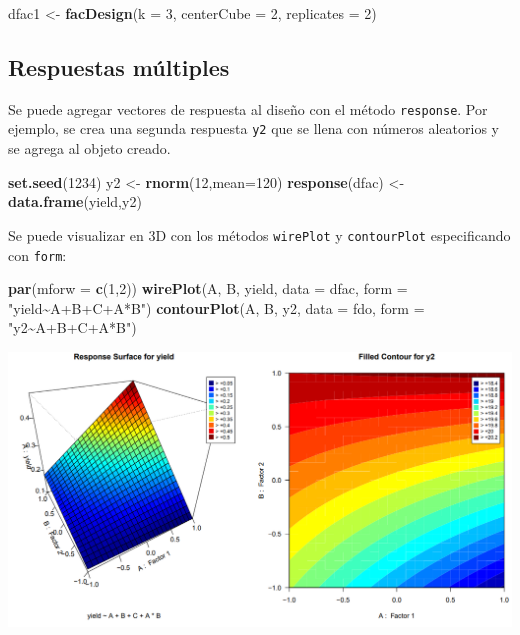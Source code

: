 \documentclass[
]{book}
\newenvironment{Shaded}{\begin{snugshade}}{\end{snugshade}}
\newcommand{\AttributeTok}[1]{\textcolor[rgb]{0.13,0.29,0.53}{#1}}
\newcommand{\DecValTok}[1]{\textcolor[rgb]{0.00,0.00,0.81}{#1}}
\newcommand{\FunctionTok}[1]{\textcolor[rgb]{0.13,0.29,0.53}{\textbf{#1}}}
\newcommand{\NormalTok}[1]{#1}
\newcommand{\OtherTok}[1]{\textcolor[rgb]{0.56,0.35,0.01}{#1}}
\newcommand{\StringTok}[1]{\textcolor[rgb]{0.31,0.60,0.02}{#1}}
\begin{document}
\begin{Shaded}
\begin{Highlighting}[]
\NormalTok{dfac1 }\OtherTok{\textless{}{-}} \FunctionTok{facDesign}\NormalTok{(}\AttributeTok{k =} \DecValTok{3}\NormalTok{, }\AttributeTok{centerCube =} \DecValTok{2}\NormalTok{, }\AttributeTok{replicates =} \DecValTok{2}\NormalTok{)}
\end{Highlighting}
\end{Shaded}

\hypertarget{respuestas-muxfaltiples}{%
\subsection{Respuestas múltiples}\label{respuestas-muxfaltiples}}

Se puede agregar vectores de respuesta al diseño con el método \texttt{response}. Por ejemplo, se crea una segunda respuesta \texttt{y2} que se llena con números aleatorios y se agrega al objeto creado.

\begin{Shaded}
\begin{Highlighting}[]
\FunctionTok{set.seed}\NormalTok{(}\DecValTok{1234}\NormalTok{)}
\NormalTok{y2 }\OtherTok{\textless{}{-}} \FunctionTok{rnorm}\NormalTok{(}\DecValTok{12}\NormalTok{,}\AttributeTok{mean=}\DecValTok{120}\NormalTok{)}
\FunctionTok{response}\NormalTok{(dfac) }\OtherTok{\textless{}{-}} \FunctionTok{data.frame}\NormalTok{(yield,y2)}
\end{Highlighting}
\end{Shaded}

Se puede visualizar en 3D con los métodos \texttt{wirePlot} y \texttt{contourPlot} especificando con \texttt{form}:

\begin{Shaded}
\begin{Highlighting}[]
\FunctionTok{par}\NormalTok{(}\AttributeTok{mforw =} \FunctionTok{c}\NormalTok{(}\DecValTok{1}\NormalTok{,}\DecValTok{2}\NormalTok{))}
\FunctionTok{wirePlot}\NormalTok{(A, B, yield, }\AttributeTok{data =}\NormalTok{ dfac, }\AttributeTok{form =} \StringTok{"yield\textasciitilde{}A+B+C+A*B"}\NormalTok{)}
\FunctionTok{contourPlot}\NormalTok{(A, B, y2, }\AttributeTok{data =}\NormalTok{ fdo, }\AttributeTok{form =} \StringTok{"y2\textasciitilde{}A+B+C+A*B"}\NormalTok{)}
\end{Highlighting}
\end{Shaded}

\includegraphics[width=7.29167in,height=\textheight]{graficos/multidfac1.png}
\end{document}
